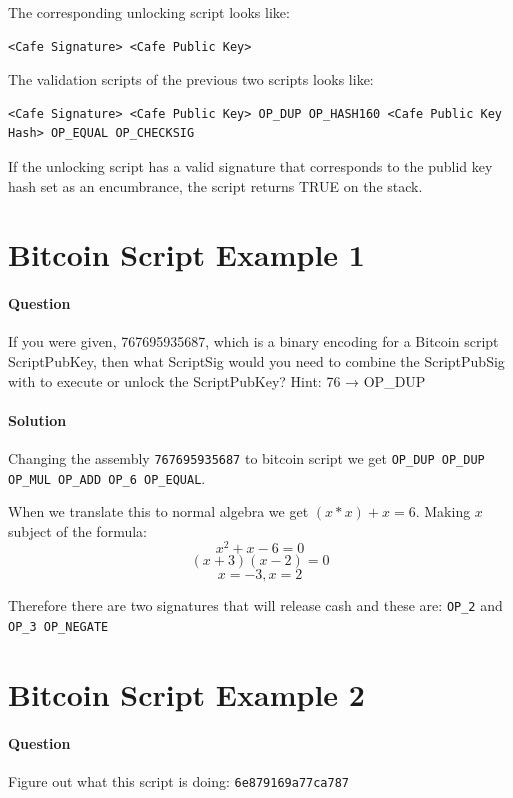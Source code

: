 \documentclass[a4paper, 12pt]{article}
\begin{document}
The corresponding unlocking script looks like:
\begin{lstlisting}[basicstyle=\ttfamily]
<Cafe Signature> <Cafe Public Key>
\end{lstlisting}

The validation scripts of the previous two scripts looks like:
\begin{lstlisting}[basicstyle=\ttfamily]
<Cafe Signature> <Cafe Public Key> OP_DUP OP_HASH160 <Cafe Public Key Hash> OP_EQUAL OP_CHECKSIG
\end{lstlisting}


If the unlocking script has a valid signature that corresponds to the publid key hash set as an encumbrance, the script returns TRUE on the stack. \cite{book:1317587}



\section{Bitcoin Script Example 1}
\paragraph{Question}
If you were given, 767695935687, which is a binary encoding for a Bitcoin script ScriptPubKey, then what ScriptSig would you need to combine the ScriptPubSig with to execute or unlock the ScriptPubKey?
Hint: 76 → OP\_DUP
\paragraph{Solution}
Changing the assembly \texttt{767695935687} to bitcoin script we get \texttt{OP\_DUP OP\_DUP OP\_MUL OP\_ADD OP\_6 OP\_EQUAL}.
\par
When we translate this to normal algebra we get $(x*x)+x=6$. Making $x$ subject of the formula:
$$x^2 + x - 6 = 0$$
$$(x + 3)(x - 2) = 0$$
$$ x = -3, x = 2$$

Therefore there are two signatures that will release cash and these are: \texttt{OP\_2} and \texttt{OP\_3 OP\_NEGATE}

\section{Bitcoin Script Example 2}
\paragraph{Question}
Figure out what this script is doing: \texttt{6e879169a77ca787}
\end{document}
